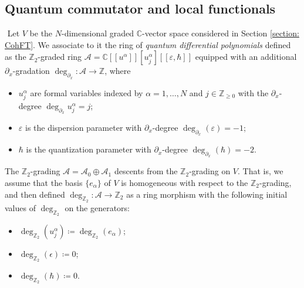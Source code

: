 \documentclass{amsart}
\numberwithin{equation}{section} %
\theoremstyle{plain}
\theoremstyle{remark}
\begin{document}
\subsection{Quantum commutator and local functionals}
﻿
Let $V$ be the $N$-dimensional graded $\mathbb{C}$-vector space considered in Section \ref{section: CohFT}. We associate to it the ring of \emph{quantum differential polynomials} defined as the $\mathbb{Z}_2$-graded ring $\mathcal{A}=\mathbb{C}[\![ u^{\alpha} ]\!][u^{\alpha}_{j}][\![\varepsilon,\hbar]\!]$ equipped with an additional $\partial_x$-gradation $\deg_{\partial_x}\colon \mathcal{A} \to \mathbb{Z}$,  where
\begin{itemize}
    \item $u^{\alpha}_{j}$ are formal variables indexed by $\alpha = 1, \dots, N$ and $j \in \mathbb{Z}_{\geq 0}$ with the $\partial_x$-degree $\deg_{\partial_x}u^{\alpha}_{j}=j$;
    \item $\varepsilon$ is the dispersion parameter with $\partial_x$-degree $\deg_{\partial_x}(\varepsilon) = -1$;
    \item $\hbar$ is the quantization parameter with $\partial_x$-degree $\deg_{\partial_x}(\hbar) = -2$.
\end{itemize}
The $\mathbb{Z}_2$-grading $\mathcal{A} = \mathcal{A}_0 \oplus \mathcal{A}_1$ descents from the $\mathbb{Z}_2$-grading on $V$. That is, we assume that the basis $\{e_\alpha\}$ of $V$ is homogeneous with respect to the $\mathbb{Z}_2$-grading, and then defined $\deg_{\mathbb{Z}_2}\colon \mathcal{A}\to \mathbb{Z}_2$ as a ring morphism with the following initial values of $\deg_{\mathbb{Z}_2}$ on the generators: 
\begin{itemize}
	\item $\deg_{\mathbb{Z}_2}(u^\alpha_j) \coloneqq \deg_{\mathbb{Z}_2}(e_\alpha)$;
	\item $\deg_{\mathbb{Z}_2}(\epsilon) \coloneqq 0$;  
	\item $\deg_{\mathbb{Z}_2}(\hbar) \coloneqq 0$.
\end{itemize}
﻿
\end{document}
